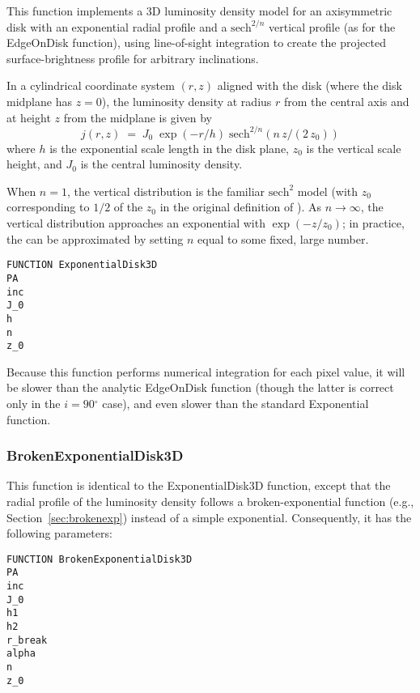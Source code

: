 \documentclass[10pt,a4paper,article]{memoir}
\newcommand{\arcdeg}{\ensuremath{^{\circ}}}
\begin{document}
This function implements a 3D luminosity density model for an
axisymmetric disk with an exponential radial profile and a
${\mathrm{sech}}^{2/n}$ vertical profile (as for the EdgeOnDisk
function), using line-of-sight integration to create the projected
surface-brightness profile for arbitrary inclinations.

In a cylindrical coordinate system $(r, z)$ aligned with the disk (where the disk
midplane has $z = 0$), the luminosity density at radius $r$ from 
the central axis and
at height $z$ from the midplane is given by
\begin{equation}
j(r,z) \; = \; J_{0} \; \exp(-r/h) \; {\mathrm{sech}}^{2/n} (n \, z/(2 \, z_{0}))
\end{equation}
where $h$ is the exponential scale length in the disk plane, $z_{0}$ is the vertical
scale height, and $J_{0}$ is the central luminosity density.

When $n = 1$, the vertical distribution is the familiar $\mathrm{sech}^2$ model
(with $z_{0}$ corresponding to $1/2$ of the $z_0$ in the original definition of
\citet{vdk81}). As $n \rightarrow \infty$, the vertical distribution approaches
an exponential with $\exp(-z/z_{0})$; in practice, the can be approximated by
setting $n$ equal to some fixed, large number.


\begin{verbatim}
FUNCTION ExponentialDisk3D
PA
inc
J_0
h
n
z_0
\end{verbatim}

Because this function performs numerical integration for each pixel value, it will be
slower than the analytic EdgeOnDisk function (though the latter is correct only in
the $i= 90\arcdeg$ case), and even slower than the standard Exponential function.



\subsubsection{BrokenExponentialDisk3D}

This function is identical to the ExponentialDisk3D function, except
that the radial profile of the luminosity density follows a
broken-exponential function (e.g., Section~\ref{sec:brokenexp}) instead
of a simple exponential. Consequently, it has the following parameters:

\begin{verbatim}
FUNCTION BrokenExponentialDisk3D
PA
inc
J_0
h1
h2
r_break
alpha
n
z_0
\end{verbatim}
\end{document}
